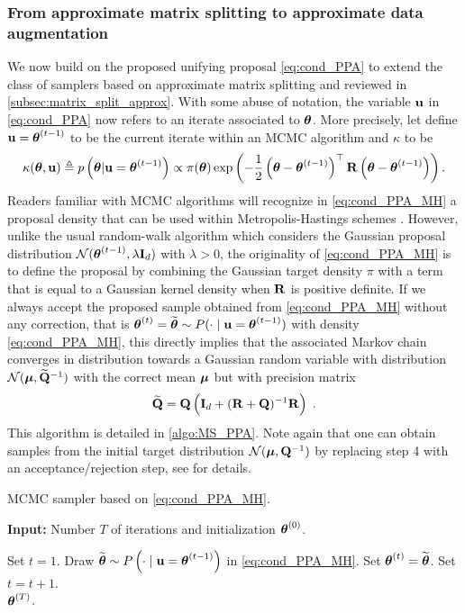 \documentclass[nohypdvips,onefignum,onetabnum]{siamart171218}
\begin{document}
\subsubsection{From approximate matrix splitting to approximate data augmentation}
We now build on the proposed unifying proposal \cref{eq:cond_PPA} to extend the class of samplers based on approximate matrix splitting and reviewed in \cref{subsec:matrix_split_approx}. 
With some abuse of notation, the variable $\mathbf{u}$ in \cref{eq:cond_PPA} now refers to an iterate associated to $\boldsymbol{\theta}$.
More precisely, let define $\mathbf{u} = \boldsymbol{\theta}^{(t-1)}$ to be the current iterate within an MCMC algorithm and $\kappa$ to be 
\begin{equation}
  \kappa(\Bs{\theta},\B{u}) \triangleq p\pr{\Bs{\theta}|\B{u}=\Bs{\theta}^{(t-1)}} \propto \pi(\Bs{\theta})\exp\pr{-\frac{1}{2}\pr{\Bs{\theta}-\Bs{\theta}^{(t-1)}}^{\top}\B{R}\pr{\Bs{\theta}-\Bs{\theta}^{(t-1)}}}. 
  \label{eq:cond_PPA_MH}
\end{equation}
Readers familiar with MCMC algorithms will recognize in \cref{eq:cond_PPA_MH} a proposal density that can be used within Metropolis-Hastings schemes \cite{Robert2004}.
However, unlike the usual random-walk algorithm which considers the Gaussian proposal distribution $\mathcal{N}(\boldsymbol{\theta}^{(t-1)},\lambda\mathbf{I}_d)$ with $\lambda >0$, the originality of \cref{eq:cond_PPA_MH} is to define the proposal by combining the Gaussian target density $\pi$ with a term that is equal to a Gaussian kernel density when $\mathbf{R}$ is positive definite. If we always accept the proposed sample obtained from \cref{eq:cond_PPA_MH} without any correction, that is $\boldsymbol{\theta}^{(t)} = \widetilde{\boldsymbol{\theta}} \sim P(\cdot\mid\mathbf{u}=\boldsymbol{\theta}^{(t-1)})$ with density \cref{eq:cond_PPA_MH}, this directly implies that the associated Markov chain converges in distribution towards a Gaussian random variable with distribution $\mathcal{N}(\boldsymbol{\mu},\widetilde{\mathbf{Q}}^{-1})$ with the correct mean $\boldsymbol{\mu}$ but with precision matrix 
\begin{align}
  \widetilde{\mathbf{Q}} = \mathbf{Q}\left(\mathbf{I}_d + (\mathbf{R}+\mathbf{Q})^{-1}\mathbf{R}\right)\;.
\end{align} 
This algorithm is detailed in \cref{algo:MS_PPA}. Note again that one can obtain samples from the initial target distribution $\mathcal{N}(\boldsymbol{\mu},\mathbf{Q}^{-1})$ by replacing step 4 with an acceptance/rejection step, see \cite{Robert2004} for details.
\begin{algorithm}
\caption{MCMC sampler based on \cref{eq:cond_PPA_MH}.}
\label{algo:MS_PPA}
\hspace*{\algorithmicindent} \textbf{Input:} Number $T$ of iterations and initialization $\boldsymbol{\theta}^{(0)}$.
\begin{algorithmic}[1]
\State Set $t = 1$.
  \State Draw $\widetilde{\boldsymbol{\theta}} \sim P\left(\cdot\mid\mathbf{u}=\boldsymbol{\theta}^{(t-1)}\right)$ {\color{green} in \cref{eq:cond_PPA_MH}.}
  \State Set $\boldsymbol{\theta}^{(t)} = \widetilde{\boldsymbol{\theta}}$. 
  \State Set $t = t + 1$.
\EndWhile\\
\Return $\boldsymbol{\theta}^{(T)}$.
\end{algorithmic}
\end{algorithm}
%
\end{document}
